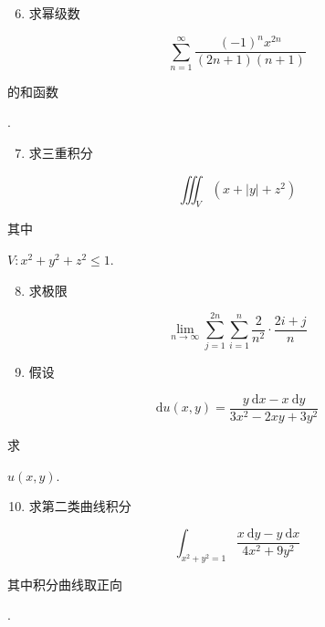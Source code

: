 \documentclass[10pt]{article}
\begin{document}
\begin{enumerate}
  \setcounter{enumi}{5}
  \item \begin{CJK}{UTF8}{mj}求幂级数\end{CJK}
\end{enumerate}
$$
\sum_{n=1}^{\infty} \frac{(-1)^{n} x^{2 n}}{(2 n+1)(n+1)}
$$
\begin{CJK}{UTF8}{mj}的和函数\end{CJK}.

\begin{enumerate}
  \setcounter{enumi}{6}
  \item \begin{CJK}{UTF8}{mj}求三重积分\end{CJK}
\end{enumerate}
$$
\iiint_{V}\left(x+|y|+z^{2}\right)
$$
\begin{CJK}{UTF8}{mj}其中\end{CJK} $V: x^{2}+y^{2}+z^{2} \leqslant 1$.

\begin{enumerate}
  \setcounter{enumi}{7}
  \item \begin{CJK}{UTF8}{mj}求极限\end{CJK}
\end{enumerate}
$$
\lim _{n \rightarrow \infty} \sum_{j=1}^{2 n} \sum_{i=1}^{n} \frac{2}{n^{2}} \cdot \frac{2 i+j}{n}
$$

\begin{enumerate}
  \setcounter{enumi}{8}
  \item \begin{CJK}{UTF8}{mj}假设\end{CJK}
\end{enumerate}
$$
\mathrm{d} u(x, y)=\frac{y \mathrm{~d} x-x \mathrm{~d} y}{3 x^{2}-2 x y+3 y^{2}}
$$
\begin{CJK}{UTF8}{mj}求\end{CJK} $u(x, y)$.

\begin{enumerate}
  \setcounter{enumi}{9}
  \item \begin{CJK}{UTF8}{mj}求第二类曲线积分\end{CJK}
\end{enumerate}
$$
\int_{x^{2}+y^{2}=1} \frac{x \mathrm{~d} y-y \mathrm{~d} x}{4 x^{2}+9 y^{2}}
$$
\begin{CJK}{UTF8}{mj}其中积分曲线取正向\end{CJK}.
\end{document}
